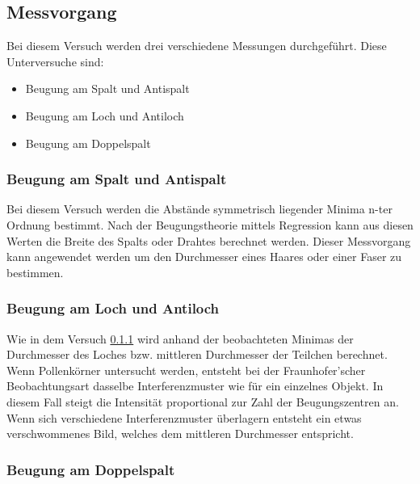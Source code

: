 \newpage
\subsection{Messvorgang}
Bei diesem Versuch werden drei verschiedene Messungen durchgeführt. Diese Unterversuche sind:
\begin{itemize}
	\item Beugung am Spalt und Antispalt
	\item Beugung am Loch und Antiloch
	\item Beugung am Doppelspalt 
\end{itemize}

\subsubsection{Beugung am Spalt und Antispalt}\label{cap:Spalt}
Bei diesem Versuch werden die Abstände symmetrisch liegender Minima n-ter Ordnung bestimmt. Nach der Beugungstheorie mittels Regression kann aus diesen Werten die Breite des Spalts oder Drahtes berechnet werden. Dieser Messvorgang kann angewendet werden um den Durchmesser eines Haares oder einer Faser zu bestimmen.

\subsubsection{Beugung am Loch und Antiloch}
Wie in dem Versuch \ref{cap:Spalt} wird anhand der beobachteten Minimas der Durchmesser des Loches bzw. mittleren Durchmesser der Teilchen berechnet. Wenn Pollenkörner untersucht werden, entsteht bei der Fraunhofer'scher Beobachtungsart dasselbe Interferenzmuster wie für ein einzelnes Objekt. In diesem Fall steigt die Intensität proportional zur Zahl der Beugungszentren an. Wenn sich verschiedene Interferenzmuster überlagern entsteht ein etwas verschwommenes Bild, welches dem mittleren Durchmesser entspricht.

\subsubsection{Beugung am Doppelspalt}
